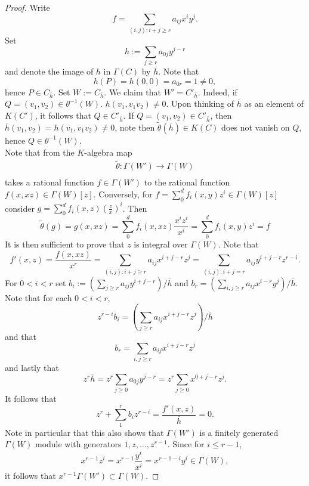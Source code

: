         \begin{proof}
            Write 
            $$
                f = \sum_{(i,j) : i+j\geq r} a_{ij}x^i y^j.
            $$
            Set
            $$
                h := \sum_{j\geq r} a_{0j} y^{j-r}
            $$ 
            and denote the image of $h$ in $\Gamma(C)$ by $\overline{h}$. Note that 
            $$
                h(P)=h(0,0) = a_{0r}= 1\neq 0,
            $$
            hence $P\in C_{\overline{h}}$. Set $W := C_{\overline{h}}$. We claim that $W'=C'_{\overline{h}}$. Indeed, if $Q=(v_1,v_2)\in \theta^{-1}(W)$. $h(v_1,v_1v_2)\neq 0$. Upon thinking of $\overline{h}$ as an element of $K(C')$, it follows that $Q\in C'_{\overline{h}}$. If $Q=(v_1,v_2)\in C'_{\overline{h}}$, then $\overline{h}(v_1,v_2)=h(v_1,v_1v_2)\neq 0$, note then $\widetilde{\theta}(\overline{h})\in K(C)$ does not vanish on $Q$, hence $Q\in \theta^{-1}(W)$.\\
            Note that from the $K$-algebra map 
            \begin{gather*}
                \widetilde{\theta}: \Gamma(W')\rightarrow \Gamma(W)\\
            \end{gather*}
            takes a rational function $f\in \Gamma(W')$ to the rational function $f(x,xz)\in \Gamma(W)[z]$. Conversely, for $f = \sum_0^d f_i(x,y)z^i\in \Gamma(W)[z]$ consider $g= \sum_0^d f_i(x,z) \left(\frac{z}{x}\right)^i$. Then 
            $$
                \widetilde{\theta}(g)=g(x,xz) = \sum_0^d f_i(x,xz) \frac{x^iz^i}{x^i} = \sum_0^d f_i(x,y) z^i = f
            $$
            It is then sufficient to prove that $z$ is integral over $\Gamma(W)$. Note that 
            $$
                f'(x,z)= \frac{f(x,xz)}{x^r} = \sum_{(i,j): i+j\geq r} a_{ij} x^{i+j-r}z^j = \sum_{(i,j) : i+j=r} a_{ij}y^{i+j-r}z^{r-i}.
            $$
            For $0<i<r$ set $b_i := \left(\sum_{j\geq r} a_{ij}y^{i+j-r}\right)/\overline{h}$ and $b_r = \left(\sum_{i,j\geq r} a_{ij} x^{i-r}y^j\right)/\overline{h}$. Note that for each $0<i<r$, 
            $$
                z^{r-i}b_i = \left(\sum_{j\geq r} a_{ij} x^{i+j-r}z^j \right)/\overline{h} 
            $$
            and that 
            $$
                b_r = \sum_{i,j\geq r} a_{ij} x^{i+j-r}z^j
            $$
            and lastly that 
            $$
                z^r\overline{h} = z^r\sum_{j\geq 0} a_{0j} y^{j-r} = z^r \sum_{j\geq 0} x^{0+j-r} z^j.
            $$
            It follows that 
            $$
                z^r + \sum_1^r b_i z^{r-i} = \frac{f'(x,z)}{\overline{h}} = 0. 
            $$
            Note in particular that this also shows that $\Gamma(W')$ is a finitely generated $\Gamma(W)$ module with generators $1,z,\dots,z^{r-1}$. Since for $i\leq r-1$, 
            $$
                x^{r-1}z^i = x^{r-1}\frac{y^i}{x^i}= x^{r-1-i}y^i\in \Gamma(W),
            $$
            it follows that $x^{r-1}\Gamma(W')\subset \Gamma(W)$.
        \end{proof}
